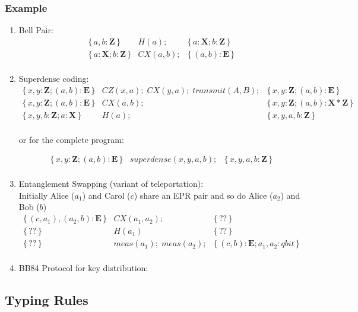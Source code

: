 \documentclass[acmsmall,nonacm,review,timestamp]{acmart}
\newcommand{\Z}{\ensuremath{\mathbf{Z}}\xspace}
\newcommand{\X}{\ensuremath{\mathbf{X}}\xspace}
\newcommand{\E}{\ensuremath{\mathbf{E}}\xspace}
\newcommand\hoare[3]{\{\,#1\,\}&#2&\{\,#3\,\}}
\begin{document}
\subsubsection{Example}
\begin{enumerate}
	\item Bell Pair:
\[ \begin{array}{rcl}
\hoare{a, b : \Z}{H(a);}{a : \X; b: \Z} \\
\hoare{a : \X; b: \Z}{CX(a, b);}{(a, b): \E} \\
\end{array} \]

	\item Superdense coding:
\[ \begin{array}{rcl}
\hoare{x, y : \Z; (a, b): \E}{CZ(x,a); \; CX(y, a); \; transmit(A, B);}{x, y : \Z; (a, b): \E} \\
\hoare{x, y : \Z; (a, b): \E}{CX(a, b);}{x, y : \Z; (a, b): \X \ast \Z} \\
\hoare{x, y, b : \Z; a: \X}{H(a);}{x, y, a, b : \Z} \\
\end{array} \]

or for the complete program:

\[ \begin{array}{rcl}
\hoare{x, y : \Z; (a, b): \E}{ superdense(x, y, a, b);}{x, y, a, b : \Z} \\
\end{array} \]


	\item Entanglement Swapping (variant of teleportation):\\
	Initially Alice ($a_1$) and Carol ($c$) share an EPR pair and so do Alice ($a_2$) and Bob ($b$)
\[ \begin{array}{rcl}
\hoare{(c, a_1), (a_2, b): \E}{CX(a_1, a_2);}{??} \\
\hoare{??}{H(a_1)}{??}\\
\hoare{??}{meas(a_1); \; meas(a_2);}{(c,b): \E; a_1, a_2 : qbit}\\
\end{array} \]

\item BB84 Protocol for key distribution:
\end{enumerate}


\subsection{Typing Rules}
\end{document}
